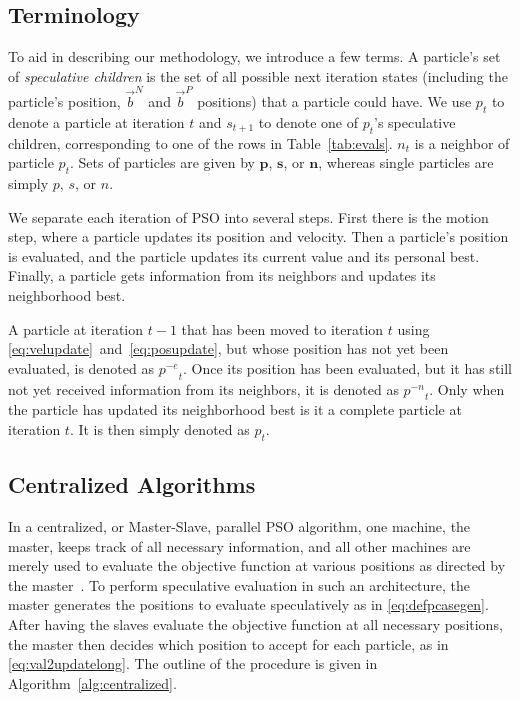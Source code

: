 \documentclass[smallcondensed]{svjour3}
\newcommand{\alg}[1]{Algorithm~\ref{alg:#1}}
\providecommand{\pers}{\ensuremath{P}}
\providecommand{\neigh}{\ensuremath{N}}
\providecommand{\nbest}{\ensuremath{\Vec{b}^\neigh}}
\providecommand{\pbest}{\ensuremath{\Vec{b}^\pers}}
\providecommand{\noeval}[1]{\ensuremath{#1^{-e}}}
\providecommand{\nonbest}[1]{\ensuremath{#1^{-n}}}
\providecommand{\p}{\ensuremath{p}}
\providecommand{\pset}{\ensuremath{\mathbf{p}}}
\providecommand{\s}{\ensuremath{s}}
\providecommand{\sset}{\ensuremath{\mathbf{s}}}
\providecommand{\n}{\ensuremath{n}}
\providecommand{\nset}{\ensuremath{\mathbf{n}}}
\begin{document}
\subsection{Terminology}

To aid in describing our methodology, we introduce a few terms.  A particle's
set of \emph{speculative children} is the set of all possible next iteration
states (including the particle's position, $\nbest$ and $\pbest$ positions)
that a particle could have.  We use $\p_t$ to denote a particle at iteration
$t$ and $\s_{t+1}$ to denote one of $\p_t$'s speculative children,
corresponding to one of the rows in Table~\ref{tab:evals}.  $\n_t$ is a
neighbor of particle $\p_t$.  Sets of particles are given by $\pset$, $\sset$,
or $\nset$, whereas single particles are simply $\p$, $\s$, or $\n$.

We separate each iteration of PSO into several steps.  First there is the
motion step, where a particle updates its position and velocity.  Then a
particle's position is evaluated, and the particle updates its current value
and its personal best.  Finally, a particle gets information from its neighbors
and updates its neighborhood best.

A particle at iteration $t-1$ that has been moved to iteration $t$ using
\eqref{eq:velupdate}~and~\eqref{eq:posupdate}, but whose position has
not yet been evaluated, is denoted as $\noeval{\p}_t$.  Once its position has
been evaluated, but it has still not yet received information from its
neighbors, it is denoted as $\nonbest{\p}_t$.  Only when the particle has
updated its neighborhood best is it a complete particle at iteration $t$.  It
is then simply denoted as $\p_t$.

\subsection{Centralized Algorithms}

In a centralized, or Master-Slave, parallel PSO algorithm, one machine, the
master, keeps track of all necessary information, and all other machines are
merely used to evaluate the objective function at various positions as directed
by the master~\citep{belal-2004-parallel-models-for-pso}.  To perform
speculative evaluation in such an architecture, the master generates the
positions to evaluate speculatively as in \eqref{eq:defpcasegen}.  After having
the slaves evaluate the objective function at all necessary positions, the
master then decides which position to accept for each particle, as in
\eqref{eq:val2updatelong}.  The outline of the procedure is given in
\alg{centralized}.
\end{document}
